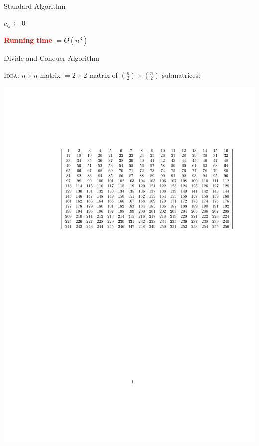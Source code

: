\documentclass{beamer}
\begin{document}
\begin{frame}{Standard Algorithm}
    \begin{algorithm}[H]
        \begin{algorithmic}
        \STATE \hrulefill
                \STATE $c_{ij} \leftarrow 0$
                \ENDFOR
            \ENDFOR
        \ENDFOR
        \STATE \hrulefill
        \end{algorithmic}
    \end{algorithm}
    \textbf{\textcolor{red}{Running time}} $=\Theta(n^3)$
\end{frame}

\begin{frame}[fragile]{Divide-and-Conquer Algorithm}
    \begin{alertblock}{\textsc{Idea:}}
        $n \times n$ matrix $= 2 \times 2$ matrix of $\left(\frac{n}{2}\right) \times \left(\frac{n}{2}\right)$ submatrices:
    \end{alertblock}
    \centering
    \includegraphics[trim=45mm 100mm 15mm 40mm, clip, width=\textwidth]{figures/quadrants}
\end{frame}
\end{document}
